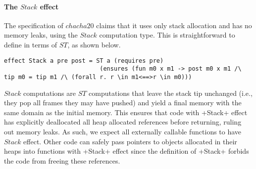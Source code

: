 \paragraph*{The \lst$Stack$ effect} The specification of \lst$chacha20$
claims that it uses only stack allocation and has no memory leaks,
using the \lst$Stack$ computation type. This is straightforward to
define in terms of \lst$ST$, as shown below.

\begin{lstlisting}[numbers=none]
effect Stack a pre post = ST a (requires pre)
                           (ensures (fun m0 x m1 -> post m0 x m1 /\  tip m0 = tip m1 /\ (forall r. r \in m1<==>r \in m0)))
\end{lstlisting}

\noindent \lst$Stack$ computations are \lst$ST$ computations that
leave the stack tip unchanged (i.e., they pop all frames they may
have pushed) and yield a final memory with the same domain as the initial memory.
%
This ensures that \lowstar code with \lst+Stack+ effect has explicitly
deallocated all heap allocated references before returning,
ruling out memory leaks.
%
As such, we expect all externally callable \lowstar functions to have
\lst$Stack$ effect.
%
Other code can safely pass pointers to objects allocated in their
heaps into \lowstar functions with \li+Stack+ effect since the definition of
\li+Stack+ forbids the \lowstar code from freeing these references.





